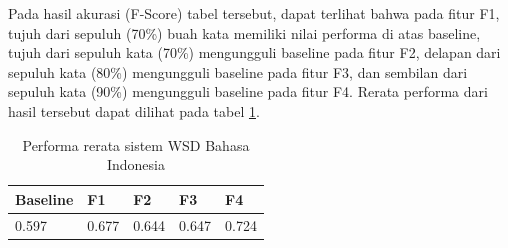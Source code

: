 Pada hasil akurasi (F-Score) tabel tersebut, dapat terlihat bahwa pada fitur F1, tujuh dari sepuluh (70\%) buah kata memiliki nilai performa di atas baseline, tujuh dari sepuluh kata (70\%) mengungguli baseline pada fitur F2, delapan dari sepuluh kata (80\%) mengungguli baseline pada fitur F3, dan sembilan dari sepuluh kata (90\%) mengungguli baseline pada fitur F4. Rerata performa dari hasil tersebut dapat dilihat pada tabel \ref{table:performa-rerata-wsd}.

\begin{table}
	\centering
	\caption{Performa rerata sistem WSD Bahasa Indonesia}
	\label{table:performa-rerata-wsd}
	\begin{tabular}{|p{2cm}|p{2cm}|p{2cm}|p{2cm}|p{2cm}|}
		\hline
		\textbf{Baseline} & \textbf{F1} & \textbf{F2} & \textbf{F3} & \textbf{F4} \\ \hline
		0.597 & 0.677 & 0.644 & 0.647 & 0.724 \\ \hline
	\end{tabular}
\end{table}


